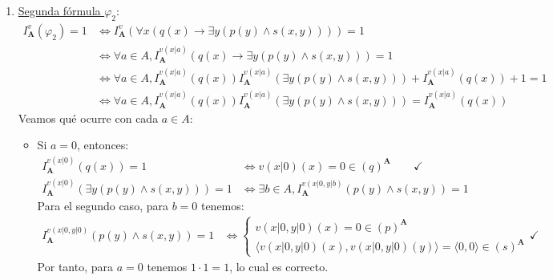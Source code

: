 \documentclass[12pt]{article}
\renewcommand{\bf}[1]{\mathbf{#1}}
\begin{document}
\begin{ejercicio}
\begin{enumerate}
        \item \ul{Segunda fórmula $\varphi_2$}:
        \begin{align*}
            I_{\bf{A}}^v(\varphi_2) = 1 &\Longleftrightarrow
            I_{\bf{A}}^v(\forall x\left( q(x) \rightarrow \exists y\left( p(y) \land s(x,y) \right) \right)) = 1\\
            & \Longleftrightarrow \forall a\in A, I_{\bf{A}}^{v(x|a)}(q(x) \rightarrow \exists y\left( p(y) \land s(x,y) \right)) = 1\\
            & \Longleftrightarrow \forall a\in A, I_{\bf{A}}^{v(x|a)}(q(x))I_{\bf{A}}^{v(x|a)}(\exists y\left( p(y) \land s(x,y) \right))  + I_{\bf{A}}^{v(x|a)}(q(x)) + 1 = 1\\
            & \Longleftrightarrow \forall a\in A, I_{\bf{A}}^{v(x|a)}(q(x))I_{\bf{A}}^{v(x|a)}(\exists y\left( p(y) \land s(x,y) \right)) = I_{\bf{A}}^{v(x|a)}(q(x))
        \end{align*}
        Veamos qué ocurre con cada $a\in A$:
        \begin{itemize}
            \item Si $a=0$, entonces:
            \begin{align*}
                I_{\bf{A}}^{v(x|0)}(q(x)) = 1 &\Longleftrightarrow v(x|0)(x) = 0 \in (q)^{\bf{A}} \qquad \checkmark \\
                I_{\bf{A}}^{v(x|0)}(\exists y\left( p(y) \land s(x,y) \right)) = 1 &\Longleftrightarrow \exists b\in A, I_{\bf{A}}^{v(x|0,y|b)}(p(y) \land s(x,y)) = 1
            \end{align*}
            Para el segundo caso, para $b=0$ tenemos:
            \begin{align*}
                I_{\bf{A}}^{v(x|0,y|0)}(p(y) \land s(x,y)) = 1 &\Longleftrightarrow \left\{
                    \begin{array}{l}
                        v(x|0,y|0)(x) = 0 \in (p)^{\bf{A}}\\
                        \langle v(x|0,y|0)(x), v(x|0,y|0)(y)\rangle = \langle 0, 0\rangle \in (s)^{\bf{A}}
                    \end{array}
                \right. \checkmark
            \end{align*}
            Por tanto, para $a=0$ tenemos $1\cdot 1 = 1$, lo cual es correcto.
    

\end{itemize}
\end{enumerate}
\end{ejercicio}
\end{document}
